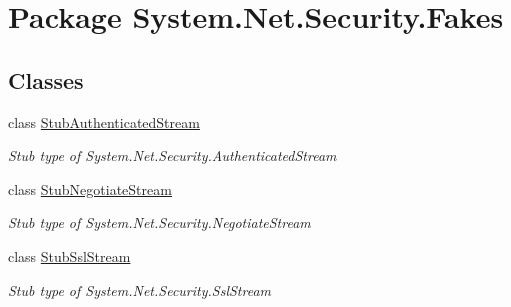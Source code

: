 \hypertarget{namespace_system_1_1_net_1_1_security_1_1_fakes}{\section{Package System.\-Net.\-Security.\-Fakes}
\label{namespace_system_1_1_net_1_1_security_1_1_fakes}
}
\subsection*{Classes}
\begin{DoxyCompactItemize}
\item 
class \hyperlink{class_system_1_1_net_1_1_security_1_1_fakes_1_1_stub_authenticated_stream}{Stub\-Authenticated\-Stream}
\begin{DoxyCompactList}\small\item\em Stub type of System.\-Net.\-Security.\-Authenticated\-Stream\end{DoxyCompactList}\item 
class \hyperlink{class_system_1_1_net_1_1_security_1_1_fakes_1_1_stub_negotiate_stream}{Stub\-Negotiate\-Stream}
\begin{DoxyCompactList}\small\item\em Stub type of System.\-Net.\-Security.\-Negotiate\-Stream\end{DoxyCompactList}\item 
class \hyperlink{class_system_1_1_net_1_1_security_1_1_fakes_1_1_stub_ssl_stream}{Stub\-Ssl\-Stream}
\begin{DoxyCompactList}\small\item\em Stub type of System.\-Net.\-Security.\-Ssl\-Stream\end{DoxyCompactList}\end{DoxyCompactItemize}
